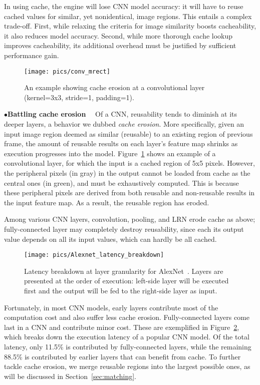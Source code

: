 \documentclass[10pt,acmtog]{acmart}
\begin{document}
In using cache, the engine will lose CNN model accuracy: it will have to reuse cached values for similar, yet nonidentical, image regions. 
This entails a complex trade-off. 
First, while relaxing the criteria for image similarity boosts cacheability, it also reduces model accuracy.
Second, while more thorough cache lookup improves cacheability, its additional overhead must be justified by sufficient performance gain. 

\begin{figure}[t]
	\centering
	\texttt{[image: pics/conv\_mrect]}
	\caption{An example showing cache erosion at a convolutional layer (kernel=3x3, stride=1, padding=1).}
	\label{fig:conv_mrect}
\end{figure}\noindent$\bullet$\textbf{Battling cache erosion}~~
Of a CNN, reusability tends to diminish at its deeper layers, a behavior we dubbed \textit{cache erosion}. 
More specifically, given an input image region deemed as similar (reusable) to an existing region of previous frame, the amount of reusable results on each layer's feature map shrinks as execution progresses into the model.
Figure~\ref{fig:conv_mrect} shows an example of a convolutional layer, for which the input is a cached region of 5x5 pixels.
However, the peripheral pixels (in gray) in the output cannot be loaded from cache as the central ones (in green), and must be exhaustively computed. 
This is because these peripheral pixels are derived from both reusable and non-reusable results in the input feature map. 
As a result, the reusable region has eroded.

Among various CNN layers, convolution, pooling, and LRN erode cache as above; 
fully-connected layer may completely destroy reusability, since each its output value depends on all its input values, which can hardly be all cached. 
\begin{figure}[t]
	\centering
	\texttt{[image: pics/Alexnet\_latency\_breakdown]}
	\caption{Latency breakdown at layer granularity for AlexNet~\cite{alexnet}. Layers are presented at the order of execution: left-side layer will be executed first and the output will be fed to the right-side layer as input.}
	\label{fig:alexnet}
\end{figure}

Fortunately, in most CNN models, early layers contribute most of the computation cost and also suffer less cache erosion. 
Fully-connected layers come last in a CNN and contribute minor cost.
These are exemplified in Figure~\ref{fig:alexnet}, which breaks down the execution latency of a popular CNN model. 
Of the total latency, only 11.5\% is contributed by fully-connected layers, while the remaining 88.5\% is contributed by earlier layers that can benefit from cache. 
To further tackle cache erosion, we merge reusable regions into the largest possible ones, as will be discussed in Section~\ref{sec:matching}. 
\end{document}
